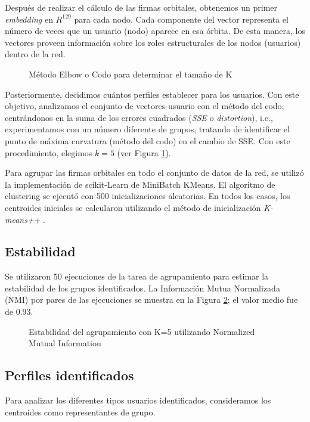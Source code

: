 Después de realizar el cálculo de las firmas orbitales, obtenemos un primer \textit{embedding} en ${R}^{129}$ para cada nodo. Cada componente del vector representa el número de veces que un usuario (nodo) aparece en esa órbita. De esta manera, los vectores proveen información sobre los roles estructurales de los nodos (usuarios) dentro de la red.

 \begin{figure}[htbp]
   \centering
   
    \caption{Método Elbow o Codo para determinar el tamaño de K}
    \label{fig:elbowmethod}
\end{figure}

Posteriormente, decidimos cuántos perfiles establecer para los usuarios. Con este objetivo, analizamos el conjunto de vectores-usuario con el método del codo, centrándonos en la suma de los errores cuadrados (\textit{SSE} o \textit{distortion}), i.e., experimentamos con un número diferente de grupos, tratando de identificar el punto de máxima curvatura (método del codo) en el cambio de SSE. Con este procedimiento, elegimos $k = 5$ (ver Figura \ref{fig:elbowmethod}).

Para agrupar las firmas orbitales en todo el conjunto de datos de la red, se utilizó la implementación de scikit-Learn de MiniBatch KMeans. El algoritmo de clustering se ejecutó con 500 inicializaciones aleatorias. En todos los casos, los centroides iniciales se calcularon utilizando el método de inicialización \textit{K-means++} \cite{arthur_k-means_nodate}. 

\subsection{Estabilidad}
Se utilizaron 50 ejecuciones de la tarea de agrupamiento para estimar la estabilidad de los grupos identificados. La Información Mutua Normalizada (NMI) por pares de las ejecuciones se muestra en la Figura \ref{fig:estability-NMI}; el valor medio fue de 0.93.

\begin{figure}[htbp]
   \centering
   
    \caption{Estabilidad del agrupamiento con K=5 utilizando Normalized Mutual Information}
    \label{fig:estability-NMI}
\end{figure}

\subsection{Perfiles identificados}
Para analizar los diferentes tipos usuarios identificados, consideramos los centroides como representantes de grupo. 

